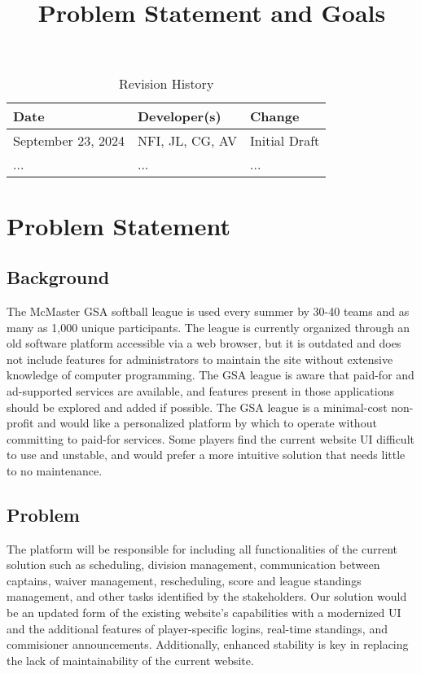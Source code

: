 \documentclass{article}
\title{Problem Statement and Goals\\\progname}
\author{\authname}
\date{}
\begin{document}
\maketitle

\begin{table}[hp]
\caption{Revision History} \label{TblRevisionHistory}
\begin{tabularx}{\textwidth}{llX}
\toprule
\textbf{Date} & \textbf{Developer(s)} & \textbf{Change}\\
\midrule
September 23, 2024 & NFI, JL, CG, AV & Initial Draft\\
... & ... & ...\\
\bottomrule
\end{tabularx}
\end{table}

\newpage{}

\section{Problem Statement}

\subsection{Background}

The McMaster GSA softball league is used every summer by 30-40 teams and
as many as 1,000 unique participants. The league is currently organized through
an old software platform accessible via a web browser, but it is outdated and
does not include features for administrators to maintain the site without
extensive knowledge of computer programming. The GSA league is aware that
paid-for and ad-supported services are available, and features present in
those applications should be explored and added if possible. The GSA league
is a minimal-cost non-profit and would like a personalized platform by which
to operate without committing to paid-for services. Some players find the
current website UI difficult to use and unstable, and would prefer a more
intuitive solution that needs little to no maintenance.

\subsection{Problem}

The platform will be responsible for including all functionalities
of the current solution such as scheduling, division management,
communication between captains, waiver management, rescheduling, score and
league standings management, and other tasks identified by the stakeholders.
Our solution would be an updated form of the existing website's capabilities
with a modernized UI and the additional features of player-specific logins,
real-time standings, and commisioner announcements. Additionally, enhanced
stability is key in replacing the lack of maintainability of the current
website. 
\end{document}
